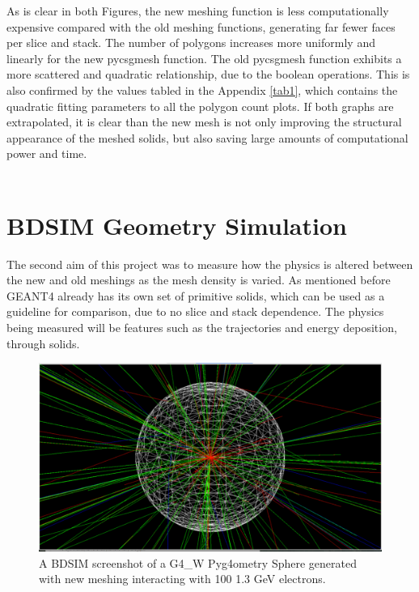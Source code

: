 \documentclass[12pt,a4paper]{article}
\begin{document}
\newpage
\noindent As is clear in both Figures, the new meshing function is less computationally expensive compared with the old meshing functions, generating far fewer faces per slice and stack. The number of polygons increases more uniformly and linearly for the new pycsgmesh function. The old pycsgmesh function exhibits a more scattered and quadratic relationship, due to the boolean operations. This is also confirmed by the values tabled in the Appendix \ref{tab1}, which contains the quadratic fitting parameters to all the polygon count plots. If both graphs are extrapolated, it is clear than the new mesh is not only improving the structural appearance of the meshed solids, but also saving large amounts of computational power and time.
\\\label{recur}\\


\section{BDSIM Geometry Simulation}
\label{int}
The second aim of this project was to measure how the physics is altered between the new and old meshings as the mesh density is varied. As mentioned before GEANT4 already has its own set of primitive solids, which can be used as a guideline for comparison, due to no slice and stack dependence. The physics being measured will be features such as the trajectories and energy deposition, through solids.

\begin{figure}[h!]
\centering
\includegraphics[scale=0.33]{Images//BDSIM//titanium.pdf}
\caption[width=\columnwidth]{A BDSIM screenshot of a G4\_W Pyg4ometry Sphere generated with new meshing interacting with 100 1.3 GeV electrons.}
\label{black}
\end{figure}
\end{document}
